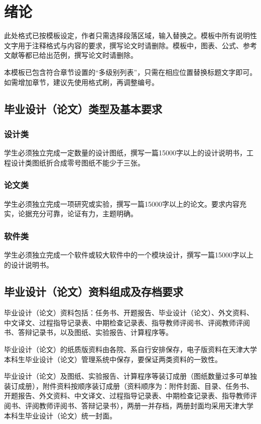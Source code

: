 \chapter{绪论}

此处格式已按模板设定，作者只需选择段落区域，输入替换之。模板中所有说明性文字用于注释格式与内容的要求，撰写论文时请删除。模板中，图表、公式、参考文献等都已给出范例，撰写论文时请删除。

本模板已包含符合章节设置的“多级别列表”，只需在相应位置替换标题文字即可。如需增加章节，建议先使用格式刷，再调整编号。

\section{毕业设计（论文）类型及基本要求}

\subsection{设计类}

学生必须独立完成一定数量的设计图纸，撰写一篇15000字以上的设计说明书，工程设计类图纸折合成零号图纸不能少于三张。

\subsection{论文类}

学生必须独立完成一项研究或实验，撰写一篇15000字以上的论文。要求内容充实，论据充分可靠，论证有力，主题明确。

\subsection{软件类}

学生必须独立完成一个软件或较大软件中的一个模块设计，撰写一篇15000字以上的设计说明书。

\section{毕业设计（论文）资料组成及存档要求}

毕业设计（论文）资料包括：任务书、开题报告、毕业设计（论文）、外文资料、中文译文、过程指导记录表、中期检查记录表、指导教师评阅书、评阅教师评阅书、答辩记录书，以及图纸、实验报告、计算程序等。

毕业设计（论文）的纸质版资料由各院、系自行安排保存，电子版资料在天津大学本科生毕业设计（论文）管理系统中保存，要保证两类资料的一致性。

毕业设计（论文）及图纸、实验报告、计算程序等装订成册（图纸数量过多可单独装订成册），附件资料按顺序装订成册（资料顺序为：附件封面、目录、任务书、开题报告、外文资料、中文译文、过程指导记录表、中期检查记录表、指导教师评阅书、评阅教师评阅书、答辩记录书），两册一并存档，两册封面均采用天津大学本科生毕业设计（论文）统一封面。

\clearpage
